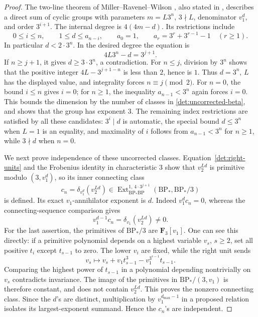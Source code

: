 \documentclass[11pt]{article}
\theoremstyle{definition}
\theoremstyle{remark}
\numberwithin{equation}{section}
\begin{document}
\begin{proof}
The two-line theorem of Miller--Ravenel--Wilson
\cite[Theorem~2.6]{MRW}, also stated in
\cite[Corollary~5.4.5(a)]{Ravenel}, describes a direct sum of cyclic
groups with parameters \(m=L3^n\), \(3\nmid L\), denominator
\(v_1^d\), and order \(3^{i+1}\).  The internal degree is
\(4(4m-d)\).  Its restrictions include
\[
 0\leq i\leq n,\qquad
 1\leq d\leq a_{n-i},\qquad
 a_0=1,\qquad a_r=3^r+3^{r-1}-1\quad(r\geq1).
\]
In particular \(d<2\cdot3^n\).
In the desired degree the equation is
\[
 4L3^n-d=3^{j+1}.
\]
If \(n\geq j+1\), it gives \(d\geq3\cdot3^n\), a contradiction.
For \(n\leq j\), division by \(3^n\) shows that the positive
integer \(4L-3^{j+1-n}\) is less than \(2\), hence is \(1\).
Thus \(d=3^n\), \(L\) has the displayed value, and integrality
forces \(n\equiv j\pmod2\).
For \(n=0\), the bound \(i\le n\) gives \(i=0\); for \(n\ge1\),
the inequality \(a_{n-1}<3^n\) again forces \(i=0\).
This bounds the dimension by the number of classes in
\eqref{det:uncorrected-beta}, and shows that the group has
exponent \(3\).
The remaining index restrictions are satisfied by all these candidates:
\(3^i\mid d\) is automatic, the special bound \(d\leq3^n\) when
\(L=1\) is an equality, and maximality of \(i\) follows from
\(a_{n-1}<3^n\) for \(n\geq1\), while \(3\nmid d\) when \(n=0\).

We next prove independence of these uncorrected classes.
Equation~\eqref{det:right-units} and the Frobenius identity in
characteristic \(3\) show that \(v_2^{Ld}\) is primitive modulo
\((3,v_1^d)\), so its inner connecting class
\[
 c_n=\delta_{v_1^d}(v_2^{Ld})
 \in\operatorname{Ext}_{\mathrm{BP}_*\mathrm{BP}}^{1,\,4\cdot3^{j+1}}(\mathrm{BP}_*,\mathrm{BP}_*/3)
\]
is defined.
Its exact \(v_1\)-annihilator exponent is \(d\).
Indeed \(v_1^d c_n=0\), whereas the connecting-sequence comparison
gives
\[
 v_1^{d-1}c_n=\delta_{v_1}(v_2^{Ld})\ne0.
\]
For the last assertion, the primitives of \(\mathrm{BP}_*/3\) are
\(\mathbf F_3[v_1]\).  One can see this directly: if a primitive
polynomial depends on a highest variable \(v_s\), \(s\geq2\),
set all positive \(t_i\) except \(t_{s-1}\) to zero.
The lower \(v_i\) are fixed, while the right unit sends
\[
 v_s\longmapsto
 v_s+v_1t_{s-1}^3-v_1^{3^{s-1}}t_{s-1}.
\]
Comparing the highest power of \(t_{s-1}\) in a polynomial
depending nontrivially on \(v_s\) contradicts invariance.
The image of the primitives in \(\mathrm{BP}_*/(3,v_1)\) is therefore
constant, and does not contain \(v_2^{Ld}\).
This proves the nonzero connecting class.
Since the \(d\)'s are distinct, multiplication by
\(v_1^{d_{\max}-1}\) in a proposed relation isolates its
largest-exponent summand.  Hence the \(c_n\)'s are independent.


\end{proof}
\end{document}

